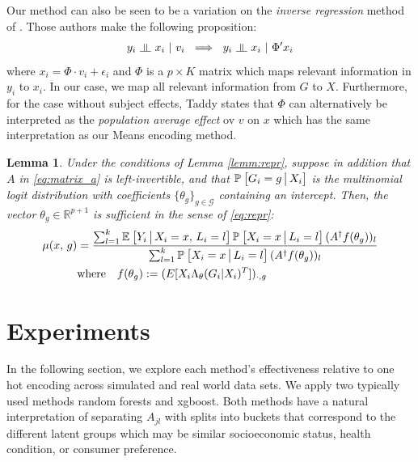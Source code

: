 \documentclass{article}
\newcommand{\indep}{\rotatebox[origin=c]{90}{$\models$}}
\theoremstyle{plain}
\newtheorem{lemm}[prop]{Lemma}
\theoremstyle{definition}
\theoremstyle{remark}
\begin{document}
{\color{red} Our method can also be seen to be a variation on the \emph{inverse regression} method of \cite{taddy2014heterogeneous}. Those authors make the following proposition:
\begin{align*}
    y_i\ \indep\ x_i\ |\ v_i\ \implies\ y_i\ \indep\ x_i\ |\ \Phi'x_i
\end{align*}
where $x_i = \Phi \cdot v_i + \epsilon_i$ and $\Phi$ is a $p \times K$ matrix which maps relevant information in $y_i$ to $x_i$. In our case, we map all relevant information from $G$ to $X$. Furthermore, for the case without subject effects, Taddy states that $\Phi$ can alternatively be interpreted as the \textit{population average effect} ov $v$ on $x$ which has the same interpretation as our Means encoding method. }



\begin{lemm}
\label{lemm:mnl}
Under the conditions of Lemma \ref{lemm:repr}, suppose in addition that $A$ in \eqref{eq:matrix_a} is left-invertible, and that $\mathbb{P}_{}\left[ G_{i}=g \,\big|\, X_{i}\right]$ is the multinomial logit distribution with coefficients $\{\theta_{g} \}_{g \in \mathcal{G}}$ containing an intercept. Then, the vector $\theta_{g} \in \mathbb{R}^{p+1}$ is sufficient in the sense of \eqref{eq:repr}:
\begin{align}
\mu(x, \, g) &= \frac{\sum_{l = 1}^k  \mathbb{E}_{}\left[Y_i \,\big|\, X_i = x, \, L_i = l\right] \mathbb{P}_{}\left[X_i = x \,\big|\, L_i = l\right] (A^\dagger f(\theta_g))_l}
                     {\sum_{l = 1}^k \mathbb{P}_{}\left[X_i = x \,\big|\, L_i = l\right] (A^\dagger f(\theta_{g}))_{l} } \\
&\text{where} \quad f(\theta_{g}) := (E[X_{i}\Lambda_{\theta}(G_{i}|X_{i})^{T}])_{\cdot, g}
\end{align}
\label{eq:}
\end{lemm}











\section{Experiments}

In the following section, we explore each method's effectiveness relative to one hot encoding across simulated and real world data sets. We apply two typically used methods random forests and xgboost. Both methods have a natural interpretation of separating $A_{jl}$ with splits into buckets that correspond to the different latent groups which may be similar socioeconomic status, health condition, or consumer preference.
\end{document}
